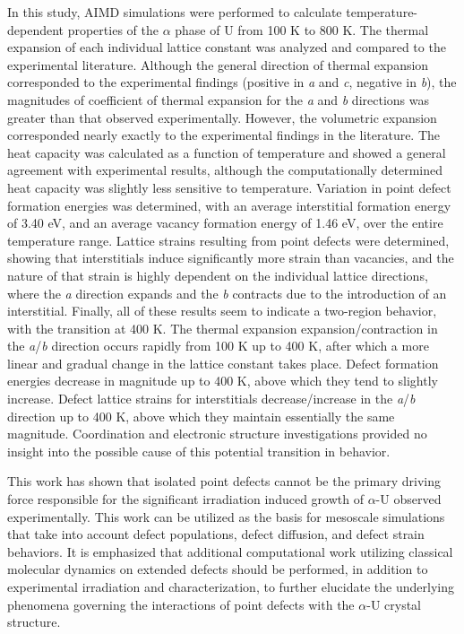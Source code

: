 \documentclass[utf8]{frontiersSCNS} %
\begin{document}
In this study, AIMD simulations were performed to calculate temperature-dependent properties of the $\alpha$ phase of U from 100 K to 800 K. The thermal expansion of each individual lattice constant was analyzed and compared to the experimental literature. Although the general direction of thermal expansion corresponded to the experimental findings (positive in \textit{a} and \textit{c}, negative in \textit{b}), the magnitudes of coefficient of thermal expansion for the \textit{a} and \textit{b} directions was greater than that observed experimentally. However, the volumetric expansion corresponded nearly exactly to the experimental findings in the literature. The heat capacity was calculated as a function of temperature and showed a general agreement with experimental results, although the computationally determined heat capacity was slightly less sensitive to temperature. Variation in point defect formation energies was determined, with an average interstitial formation energy of 3.40 eV, and an average vacancy formation energy of 1.46 eV, over the entire temperature range. Lattice strains resulting from point defects were determined, showing that interstitials induce significantly more strain than vacancies, and the nature of that strain is highly dependent on the individual lattice directions, where the \textit{a} direction expands and the \textit{b} contracts due to the introduction of an interstitial. Finally, all of these results seem to indicate a two-region behavior, with the transition at 400 K. The thermal expansion expansion/contraction in the \textit{a}/\textit{b} direction occurs rapidly from 100 K up to 400 K, after which a more linear and gradual change in the lattice constant takes place. Defect formation energies decrease in magnitude up to 400 K, above which they tend to slightly increase. Defect lattice strains for interstitials decrease/increase in the \textit{a}/\textit{b} direction up to 400 K, above which they maintain essentially the same magnitude. Coordination and electronic structure investigations provided no insight into the possible cause of this potential transition in behavior. 

This work has shown that isolated point defects cannot be the primary driving force responsible for the significant irradiation induced growth of $\alpha$-U observed experimentally. This work can be utilized as the basis for mesoscale simulations that take into account defect populations, defect diffusion, and defect strain behaviors. It is emphasized that additional computational work utilizing classical molecular dynamics on extended defects should be performed, in addition to experimental irradiation and characterization, to further elucidate the underlying phenomena governing the interactions of point defects with the $\alpha$-U crystal structure. 
\end{document}
